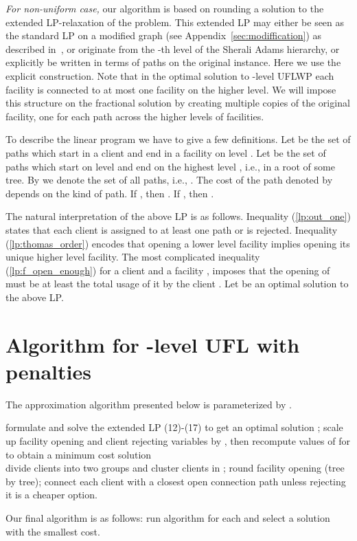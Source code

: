\documentclass{llncs}
\newcommand{\va}[1]{{\color{black}\sl  #1}}
\begin{document}
\va{For non-uniform case,} our algorithm is based on rounding a solution to the extended LP-relaxation of the problem. This extended LP may either be seen as the standard LP on a modified graph (see Appendix~\ref{sec:modiffication})
as described in~\cite{Rybicki}, or originate from the -th level of the Sherali Adams hierarchy, or explicitly be written in terms of paths on the original instance. Here we use the explicit construction.
Note that in the optimal solution to -level UFLWP each facility is connected to at most one facility on the higher level. We will impose this structure on the fractional solution
by creating multiple copies of the original facility, one for each path across the higher levels of facilities.

To describe the linear program we have to give a few definitions. Let  be the set of paths which start in a client and end in a facility on level . Let  be the set of paths which start on level  and end on the highest level , i.e., in a root of some tree.
By  we denote the set of all paths, i.e.,  . The cost of the path denoted by  depends on the kind of path.
If , then .
If , then .



The natural interpretation of the above LP is as follows.
Inequality (\ref{lp:out_one}) states that each client is assigned to at least one path or is rejected.
Inequality (\ref{lp:thomas_order}) encodes that opening a lower level facility implies opening its unique higher level facility.
The most complicated inequality (\ref{lp:f_open_enough}) for a client  and a facility ,
imposes that the opening of  must be at least the total usage of it by the client . Let  be an optimal solution to the above LP.

\section{Algorithm for -level UFL with penalties}

The approximation algorithm  presented below is parameterized by .
\begin{algorithmic}[1]
 \STATE formulate and solve the extended LP (12)-(17) to get an optimal solution  ;
 \STATE scale up facility opening and client rejecting variables by ,
 then recompute values of  for  to obtain a minimum cost solution \\
 \STATE divide clients into two groups  and 
 \STATE cluster clients in ;
 \STATE round facility opening (tree by tree);
 \STATE connect each client  with a closest open connection path unless rejecting it is a cheaper option.
\end{algorithmic}
Our final algorithm is as follows: run algorithm  for each  and select a solution with the smallest cost.
\end{document}
